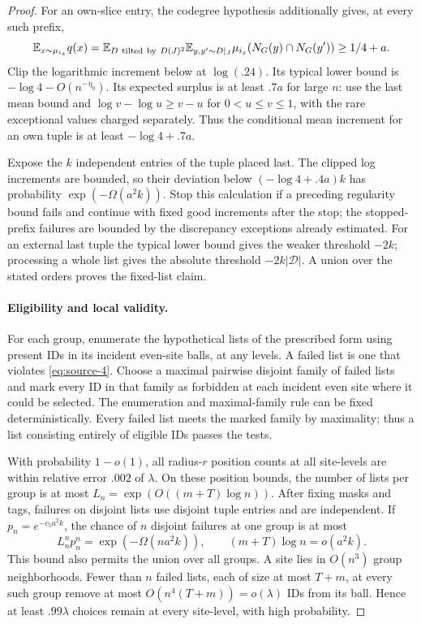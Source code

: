 \begin{proof}
For an own-slice entry, the codegree hypothesis additionally gives, at every such prefix,
\[
 \mathbb E_{x\sim\mu_{i_z}}q(x)
 =\mathbb E_{D\ {\rm tilted\ by}\ D(J)^2}
   \mathbb E_{y,y'\sim D|_J}
       \mu_{i_z}(N_G(y)\cap N_G(y'))
 \ge1/4+a.
\]
Clip the logarithmic increment below at \(\log(.24)\). Its typical lower bound is \(-\log4-O(n^{-\eta_0})\). Its expected surplus is at least \(.7a\) for large \(n\): use the last mean bound and \(\log v-\log u\ge v-u\) for \(0<u\le v\le1\), with the rare exceptional values charged separately. Thus the conditional mean increment for an own tuple is at least \(-\log4+.7a\).

Expose the \(k\) independent entries of the tuple placed last. The clipped log increments are bounded, so their deviation below \(( -\log4+.4a)k\) has probability \(\exp(-\Omega(a^2k))\). Stop this calculation if a preceding regularity bound fails and continue with fixed good increments after the stop; the stopped-prefix failures are bounded by the discrepancy exceptions already estimated. For an external last tuple the typical lower bound gives the weaker threshold \(-2k\); processing a whole list gives the absolute threshold \(-2k|\mathcal D|\). A union over the stated orders proves the fixed-list claim.

\paragraph{Eligibility and local validity.}
For each group, enumerate the hypothetical lists of the prescribed form using present IDs in its incident even-site balls, at any levels. A failed list is one that violates \eqref{eq:source-4}. Choose a maximal pairwise disjoint family of failed lists and mark every ID in that family as forbidden at each incident even site where it could be selected. The enumeration and maximal-family rule can be fixed deterministically. Every failed list meets the marked family by maximality; thus a list consisting entirely of eligible IDs passes the tests.

With probability \(1-o(1)\), all radius-\(r\) position counts at all site-levels are within relative error \(.002\) of \(\lambda\). On these position bounds, the number of lists per group is at most
\(L_n=\exp(O((m+T)\log n))\).
After fixing masks and tags, failures on disjoint lists use disjoint tuple entries and are independent. If \(p_n=e^{-c_5a^2k}\), the chance of \(n\) disjoint failures at one group is at most
\[
 L_n^n p_n^n=\exp(-\Omega(na^2k)),
 \qquad (m+T)\log n=o(a^2k).
\]
This bound also permits the union over all groups. A site lies in \(O(n^3)\) group neighborhoods. Fewer than \(n\) failed lists, each of size at most \(T+m\), at every such group remove at most
\(O(n^4(T+m))=o(\lambda)\)
IDs from its ball. Hence at least \(.99\lambda\) choices remain at every site-level, with high probability.


\end{proof}

